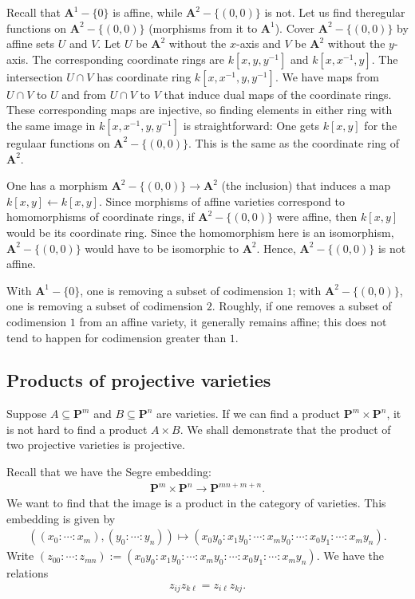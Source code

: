 \documentclass[11pt, oneside,margin=1in]{article}
\begin{document}
\begin{example}[ ]\label{}\text{}
Recall that $\mathbf{A}^1-\{0\}$ is affine, while $\mathbf{A}^2 - \{(0,0)\}$ is not. Let us find theregular functions on $\mathbf{A}^2 - \{(0,0)\}$ (morphisms from it to $\mathbf{A}^1$). Cover $\mathbf{A}^2-\{(0,0)\}$ by affine sets $U$ and $V$. Let $U$ be $\mathbf{A}^2$ without the $x$-axis and $V$ be $\mathbf{A}^2$ without the $y$-axis. The corresponding coordinate rings are $k[x,y,y^{-1}]$ and $k[x,x^{-1},y]$. The intersection $U\cap V$ has coordinate ring $k[x,x^{-1},y,y^{-1}]$. We have maps from $U\cap V$ to $U$ and from $U\cap V$ to $V$ that induce dual maps of the coordinate rings. These corresponding maps are injective, so finding elements in either ring with the same image in $k[x,x^{-1},y,y^{-1}]$ is straightforward: One gets $k[x,y]$ for the regulaar functions on $\mathbf{A}^2-\{(0,0)\}$. This is the same as the coordinate ring of $\mathbf{A}^2$.

One has a morphism $\mathbf{A}^2-\{(0,0)\}\longrightarrow \mathbf{A}^2$ (the inclusion) that induces a map $k[x,y] \longleftarrow k[x,y]$. Since morphisms of affine varieties correspond to homomorphisms of coordinate rings, if $\mathbf{A}^2-\{(0,0)\}$ were affine, then $k[x,y]$ would be its coordinate ring. Since the homomorphism here is an isomorphism, $\mathbf{A}^2-\{(0,0)\}$ would have to be isomorphic to $\mathbf{A}^2$. Hence, $\mathbf{A}^2-\{(0,0)\}$ is not affine.
\end{example}

\begin{remark}
	With $\mathbf{A}^1-\{0\}$, one is removing a subset of codimension $1$; with $\mathbf{A}^2-\{(0,0)\}$, one is removing a subset of codimension $2$. Roughly, if one removes a subset of codimension $1$ from an affine variety, it generally remains affine; this does not tend to happen for codimension greater than $1$.
\end{remark}


\subsection{Products of projective varieties}
Suppose $A\subseteq \mathbf{P}^m$ and $B\subseteq \mathbf{P}^n$ are varieties. If we can find a product $\mathbf{P}^m\times \mathbf{P}^n$, it is not hard to find a product $A\times B$. We shall demonstrate that the product of two projective varieties is projective.

Recall that we have the Segre embedding:
\begin{align*}
	\mathbf{P}^m\times \mathbf{P}^n\longrightarrow \mathbf{P}^{mn+m+n}.
\end{align*}
We want to find that the image is a product in the category of varieties. This embedding is given by
\begin{align*}
	((x_0:\cdots:x_m), (y_0:\cdots:y_n))\longmapsto (x_0y_0:x_1y_0:\cdots:x_my_0:\cdots: x_0y_1:\cdots:x_my_n).
\end{align*}
Write $(z_{00}:\cdots:z_{mn}):=(x_0y_0:x_1y_0:\cdots:x_my_0:\cdots: x_0y_1:\cdots:x_my_n)$. We have the relations
\begin{align*}
	z_{ij}z_{k\ell} = z_{i\ell}z_{kj}.
\end{align*}
\end{document}
